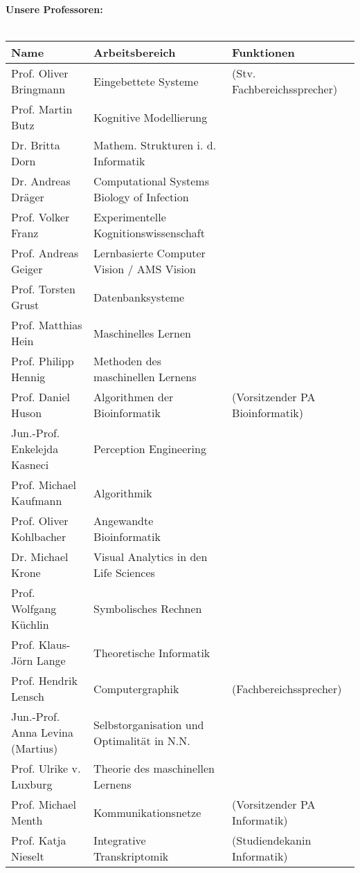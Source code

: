 \renewcommand{\arraystretch}{1}
\scriptsize
\textbf{Unsere Professoren:}\\\\
\begin{tabular}{|lll|}
\hline
Name                          & Arbeitsbereich & Funktionen \\
\hline
\hline
Prof. Oliver Bringmann        & Eingebettete Systeme & (Stv. Fachbereichssprecher)\\
Prof. Martin Butz             & Kognitive Modellierung 	&	\\
Dr. Britta Dorn               & Mathem. Strukturen i. d. Informatik &\\
Dr. Andreas Dräger			  & Computational Systems Biology of Infection &\\
Prof. Volker Franz			  & Experimentelle Kognitionswissenschaft &\\ 
Prof. Andreas Geiger          &  Lernbasierte Computer Vision / AMS Vision &\\
Prof. Torsten Grust	          & Datenbanksysteme			& \\
Prof. Matthias Hein  		  & Maschinelles Lernen & \\
Prof. Philipp Hennig		  & Methoden des maschinellen Lernens & \\
Prof. Daniel Huson            & Algorithmen der Bioinformatik & (Vorsitzender PA Bioinformatik) \\
Jun.-Prof. Enkelejda Kasneci		  & Perception Engineering &\\
Prof. Michael Kaufmann        & Algorithmik		&	\\
Prof. Oliver Kohlbacher       & Angewandte Bioinformatik &\\
Dr. Michael Krone 			  & Visual Analytics in den Life Sciences & \\
Prof. Wolfgang Küchlin        & Symbolisches Rechnen &\\
Prof. Klaus-Jörn Lange        & Theoretische Informatik	&\\
Prof. Hendrik Lensch          & Computergraphik	& (Fachbereichssprecher)\\
Jun.-Prof. Anna Levina (Martius) & Selbstorganisation und Optimalität in N.N. & \\
Prof. Ulrike v. Luxburg		  & Theorie des maschinellen Lernens & \\
Prof. Michael Menth           & Kommunikationsnetze 		& (Vorsitzender PA Informatik)\\
Prof. Katja Nieselt	          & Integrative Transkriptomik	 & (Studiendekanin Informatik\footnotemark)\\

\end{tabular}
